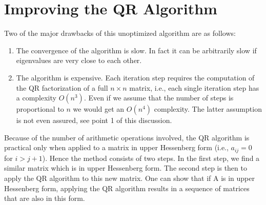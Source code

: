 \section{Improving the QR Algorithm}
Two of the major drawbacks of this unoptimized algorithm are as follows:
\begin{enumerate}
    \item The convergence of the algorithm is slow. In fact it can be arbitrarily slow if eigenvalues are very close to each other.
\item The algorithm is expensive. Each iteration step requires the computation of the QR
factorization of a full $n \times n$ matrix, i.e., each single iteration step has a complexity
$O(n^3)$. Even if we assume that the number of steps is proportional to $n$ we would
get an $O(n^4)$ complexity. The latter assumption is not even assured, see point 1 of
this discussion.
\end{enumerate}
Because of the number of arithmetic operations involved, the QR algorithm is practical
only when applied to a matrix in upper Hessenberg form (i.e., $a_{ij} = 0$ for $i > j + 1$). Hence
the method consists of two steps. In the first step, we find a similar matrix which is in upper
Hessenberg form. The second step is then to apply the QR algorithm to this new matrix.
One can show that if A is in upper Hessenberg form, applying the QR algorithm results in
a sequence of matrices that are also in this form. 


            




